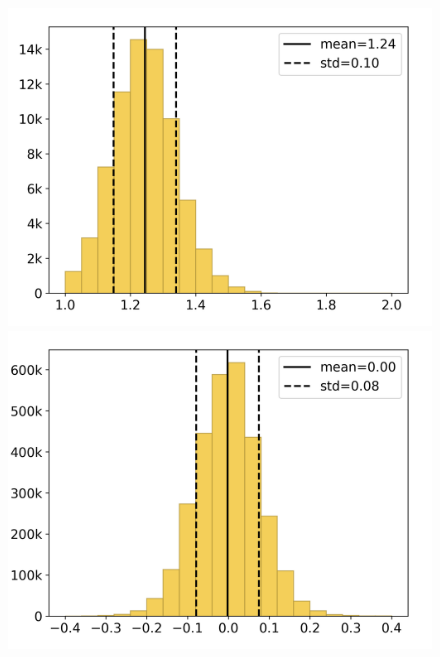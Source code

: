 \begin{figure}[H]
	\begin{minipage}{.325\textwidth}
		\includegraphics[width=\textwidth, trim=.25cm 0.25cm .25cm 0.25cm]{Resources/Images/Images/Histogram/hist_1_b.png}
	\end{minipage}
	\begin{minipage}{.325\textwidth}
		\includegraphics[width=\textwidth, clip, trim=.25cm 0.25cm .25cm 0.25cm]{Resources/Images/Images/Histogram/hist_2_b.png}
	\end{minipage}
	\begin{minipage}{.325\textwidth}

\end{minipage}
\end{figure}
